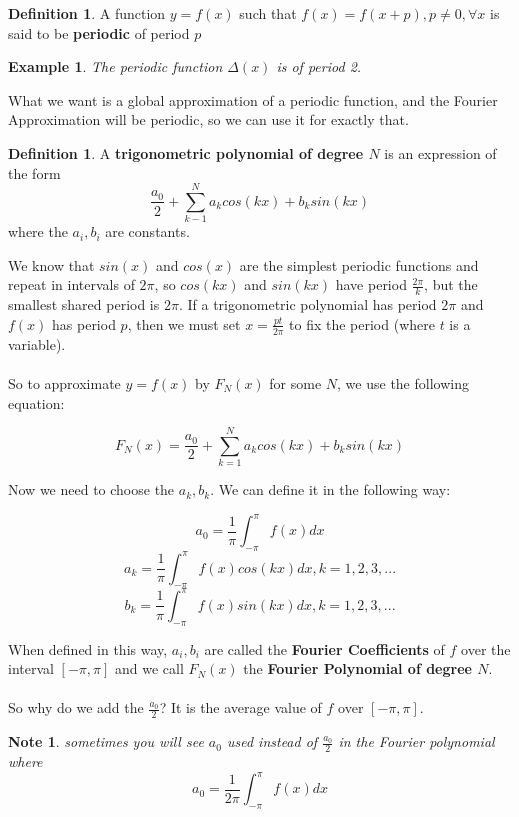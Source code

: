 \documentclass[12pt]{article}
\theoremstyle{plain}
\newtheorem*{note}{Note}
\newtheorem{example}[theorem]{Example}
\theoremstyle{definition}
\newtheorem{definition}[theorem]{Definition}
\begin{document}
\begin{definition}
	A function $y=f(x)$ such that $f(x)=f(x+p), p \neq 0, \forall x$ is said to be \textbf{periodic} of period $p$
\end{definition}

\begin{example}
	The periodic function $\Delta (x)$ is of period 2.
\end{example}

What we want is a global approximation of a periodic function, and the Fourier Approximation will be periodic, so we can use it for exactly that.

\begin{definition}
	A \textbf{trigonometric polynomial of degree $N$} is an expression of the form
	$$\frac{a_0}{2}+ \sum^N_{k-1} a_k cos(kx) + b_k sin(kx)$$ where the $a_i, b_i$ are constants.
\end{definition}

We know that $sin(x)$ and $cos(x)$ are the simplest periodic functions and repeat in intervals of $2\pi$, so $cos(kx)$ and $sin(kx)$ have period $\frac{2\pi}{k}$, but the smallest shared period is $2\pi$. If a trigonometric polynomial has period $2\pi$ and $f(x)$ has period $p$, then we must set $x=\frac{pt}{2\pi}$ to fix the period (where $t$ is a variable).\\
\\
So to approximate $y=f(x)$ by $F_N (x)$ for some $N$, we use the following equation:

$$F_N (x) = \frac{a_0}{2}+ \sum^N_{k=1} a_k cos(kx) + b_k sin(kx)$$

Now we need to choose the $a_k, b_k$. We can define it in the following way:

$$a_0 = \frac{1}{\pi} \int^{\pi}_{-\pi} f(x) dx$$
$$a_k = \frac{1}{\pi} \int^{\pi}_{-\pi} f(x) cos(kx) dx, k=1,2,3,...$$
$$b_k = \frac{1}{\pi} \int^{\pi}_{-\pi} f(x) sin(kx) dx, k=1,2,3,...$$

When defined in this way, $a_i, b_i$ are called the \textbf{Fourier Coefficients} of $f$ over the interval $[-\pi, \pi]$ and we call $F_N (x)$ the \textbf{Fourier Polynomial of degree $N$}.\\
\\
So why do we add the $\frac{a_0}{2}$? It is the average value of $f$ over $[-\pi, \pi]$.

\begin{note}
	sometimes you will see $a_0$ used instead of $\frac{a_0}{2}$ in the Fourier polynomial where $$a_0 = \frac{1}{2\pi} \int^{\pi}_{-\pi} f(x) dx$$
\end{note}
\end{document}
